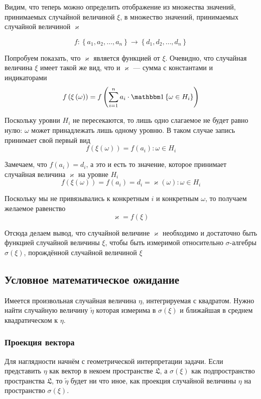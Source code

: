 Видим, что теперь можно определить отображение из множества значений,
принимаемых случайной величиной $\xi$, в множество значений,
принимаемых случайной величиной $\varkappa$

$$f: \left\{ a_1, a_2, \dots, a_n \right\}
    \rightarrow \left\{ d_1, d_2, \dots, d_n \right\}$$

Попробуем показать, что $\varkappa$ является функцией от $\xi$.
Очевидно, что случайная величина $\xi$ имеет такой же вид,
что и $\varkappa$ --- сумма с константами и индикаторами
$$f\left( \xi\left( \omega \right) \right)
    = f\left( \sum_{i=1}^n a_i \cdot \Indicator{\omega \in H_i} \right)$$

Поскольку уровни $H_i$ не пересекаются,
то лишь одно слагаемое не будет равно нулю:
$\omega$ может принадлежать лишь одному уровню.
В таком случае запись принимает свой первый вид
$$f\left( \xi\left( \omega \right) \right)
    = f\left( a_i \right): \omega \in H_i$$

Замечаем, что $f\left( a_i \right) = d_i$, а это и есть то значение,
которое принимает случайная величина $\varkappa$ на уровне $H_i$
$$f\left( \xi\left( \omega \right) \right)
    = f\left( a_i \right) = d_i
    = \varkappa\left( \omega \right): \omega \in H_i$$

Поскольку мы не привязывались к конкретным $i$ и конкретным $\omega$,
то получаем желаемое равенство
$$\varkappa = f\left( \xi \right)$$

Отсюда делаем вывод, что случайной величине $\varkappa$
необходимо и достаточно быть функцией случайной величины $\xi$,
чтобы быть измеримой относительно $\sigma$-алгебры
$\sigma\left( \xi \right)$, порождённой случайной величиной $\xi$

\subsection{Условное математическое ожидание}
Имеется произвольная случайная величина $\eta$, интегрируемая с квадратом.
Нужно найти случайную величину $\tilde{\eta}$ которая
измерима в $\sigma\left( \xi \right)$
и ближайшая в среднем квадратическом к $\eta$.

\subsubsection{Проекция вектора}
Для наглядности начнём с геометрической интерпретации задачи.
Если представить $\eta$ как вектор в некоем пространстве $\mathfrak{L}$,
а $\sigma\left( \xi \right)$ как подпространство пространства $\mathfrak{L}$,
то $\tilde{\eta}$ будет ни что иное, как проекция случайной величины $\eta$
на пространство $\sigma\left( \xi \right)$.


